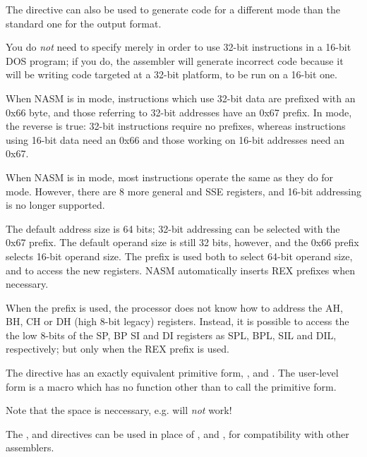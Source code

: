 The  directive can also be used to generate code for
a different mode than the standard one for the output format.

You do \emph{not} need to specify  merely in order
to use 32-bit instructions in a 16-bit DOS program; if you do, the
assembler will generate incorrect code because it will be writing
code targeted at a 32-bit platform, to be run on a 16-bit one.

When NASM is in  mode, instructions which use 32-bit
data are prefixed with an 0x66 byte, and those referring to 32-bit
addresses have an 0x67 prefix. In  mode, the reverse is
true: 32-bit instructions require no prefixes, whereas instructions
using 16-bit data need an 0x66 and those working on 16-bit
addresses need an 0x67.

When NASM is in  mode, most instructions operate the same
as they do for  mode. However, there are 8 more general and
SSE registers, and 16-bit addressing is no longer supported.

The default address size is 64 bits; 32-bit addressing can be selected
with the 0x67 prefix. The default operand size is still 32 bits,
however, and the 0x66 prefix selects 16-bit operand size.
The  prefix is used both to select 64-bit operand size, and
to access the new registers. NASM automatically inserts REX prefixes
when necessary.

When the  prefix is used, the processor does not know how to
address the AH, BH, CH or DH (high 8-bit legacy) registers. Instead,
it is possible to access the the low 8-bits of the SP, BP SI and DI
registers as SPL, BPL, SIL and DIL, respectively; but only when the
REX prefix is used.

The  directive has an exactly equivalent primitive form,
\code{[BITS 16]}, \code{[BITS 32]} and \code{[BITS 64]}. The user-level
form is a macro which has no function other than to call the primitive form.

Note that the space is neccessary, e.g.  will \emph{not} work!


The ,  and  directives can be used
in place of ,  and , for
compatibility with other assemblers.


